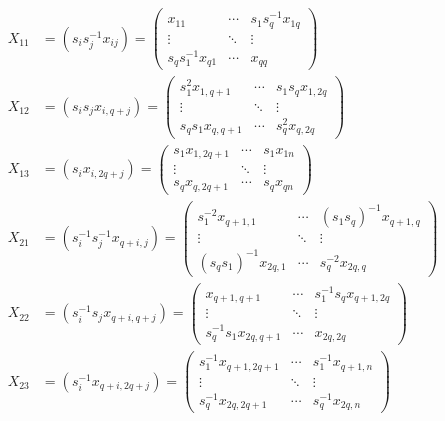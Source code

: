 \documentclass[12pt]{article}
\theoremstyle{definition}
\newcommand{\lp}{\left(}
\newcommand{\rp}{\right)}
\newcommand{\inv}{^{-1}}
\begin{document}
\begin{align*}
	X_{11} &= \lp s_i s_j \inv x_{ij} \rp =
	\begin{pmatrix}
		x_{11} &  \cdots & s_1 s_q \inv x_{1q} \\
		\vdots & \ddots & \vdots  \\
		s_q s_1 \inv x_{q1} & \cdots & x_{qq}
	\end{pmatrix} \\
	X_{12} &= (s_i s_j x_{i,q+j}) =
	\begin{pmatrix}
		s_1^2 x_{1,q+1} & \cdots & s_1 s_q x_{1, 2q} \\
		\vdots & \ddots & \vdots \\
		 s_q s_1 x_{q,q+1} & \cdots & s_q^2 x_{q,2q} 
	\end{pmatrix} \\
	X_{13} &= (s_i x_{i,2q+j}) =
	\begin{pmatrix}
		s_1 x_{1, 2q+1} & \cdots & s_1 x_{1n} \\
		\vdots & \ddots & \vdots \\
		s_q x_{q, 2q+1} & \cdots & s_q x_{qn}
	\end{pmatrix}\\
	X_{21} &= \lp s_i \inv s_j \inv x_{q+i,j} \rp =
	\begin{pmatrix}
		s_1^{-2} x_{q+1, 1} & \cdots & (s_1 s_q) \inv x_{q+1, q} \\
		\vdots & \ddots & \vdots \\
		(s_q s_1) \inv x_{2q,1} & \cdots & s_q^{-2} x_{2q,q}
	\end{pmatrix} \\
	X_{22} &= \lp s_{i} \inv s_{j} x_{q+i,q+j} \rp =
	\begin{pmatrix}
	 	x_{q+1, q+1} & \cdots & s_{1} \inv s_{q} x_{q+1, 2q} \\
	 	\vdots & \ddots & \vdots \\
	 	s_{q} \inv s_{1} x_{2q, q+1} & \cdots & x_{2q, 2q}
	\end{pmatrix} \\
	X_{23} &= \lp s_{i} \inv x_{q+i, 2q+j} \rp = 
	\begin{pmatrix}
		s_{1} \inv x_{q+1, 2q+1} & \cdots & s_{1} \inv x_{q+1, n} \\
		\vdots & \ddots & \vdots \\
		s_{q} \inv x_{2q, 2q+1} & \cdots & s_{q} \inv x_{2q, n}
	\end{pmatrix} \\
\end{align*}
\end{document}

